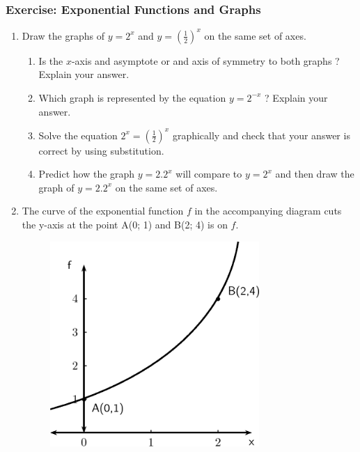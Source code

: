             \subsubsection{ Exercise: Exponential Functions and Graphs }
            \nopagebreak
          \label{m39348*id253033}\begin{enumerate}[noitemsep, label=\textbf{\arabic*}. ] 
            \label{m39348*uid197}\item Draw the graphs of $y={2}^{x}$ and $y={\left(\frac{1}{2}\right)}^{x}$ on the same set of axes.
\label{m39348*id253098}\begin{enumerate}[noitemsep, label=\textbf{\alph*}. ] 
            \label{m39348*uid198}\item Is the $x$-axis and asymptote or and axis of symmetry to both graphs ? Explain your answer.
\label{m39348*uid199}\item Which graph is represented by the equation $y={2}^{-x}$ ? Explain your answer.
\label{m39348*uid200}\item Solve the equation ${2}^{x}={\left(\frac{1}{2}\right)}^{x}$ graphically and check that your answer is correct by using substitution.
\label{m39348*uid201}\item Predict how the graph $y=2.{2}^{x}$ will compare to $y={2}^{x}$ and then draw the graph of $y=2.{2}^{x}$ on the same set of axes.
\end{enumerate}
                \label{m39348*uid202}\item The curve of the exponential function $f$ in the accompanying diagram cuts the y-axis at the point A(0; 1) and B(2; 4) is on $f$.
    \setcounter{subfigure}{0}
	\begin{figure}[H] %
    \begin{center}
    \label{m39348*id253318!!!underscore!!!media}\label{m39348*id253318!!!underscore!!!printimage}\includegraphics[width=300px]{col11306.imgs/m39348_MG10C11_033.png} %

\end{center}
\end{figure}
\end{enumerate}
